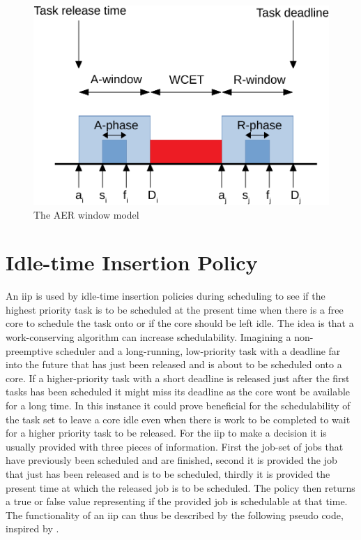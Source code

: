 \documentclass{kththesis}
\begin{document}
\begin{figure}

    \centering

    \includegraphics[width=0.8\linewidth]{images/aer_window_model.pdf}

    \caption{The AER window model}

    \label{fig:aer_window_model}

\end{figure}


\section{Idle-time Insertion Policy}

An \acrfull{iip} is used by idle-time insertion policies during scheduling to see if the highest
priority task is to be scheduled at the present time when there is a free core to schedule the task
onto or if the core should be left idle. The idea is that a work-conserving algorithm can increase
schedulability. Imagining a non-preemptive scheduler and a long-running, low-priority task with a
deadline far into the future that has just been released and is about to be scheduled onto a core.
If a higher-priority task with a short deadline is released just after the first tasks has been
scheduled it might miss its deadline as the core wont be available for a long time. In this instance
it could prove beneficial for the schedulability of the task set to leave a core idle even when
there is work to be completed to wait for a higher priority task to be released. For the
\acrshort{iip} to make a decision it is usually provided with three pieces of information. First the
job-set of jobs that have previously been scheduled and are finished, second it is provided the job
that just has been released and is to be scheduled, thirdly it is provided the present time at which
the released job is to be scheduled. The policy then returns a true or false value representing if
the provided job is schedulable at that time. The functionality of an \acrshort{iip} can thus be
described by the following pseudo code, inspired by \parencite{nasri_exact_2017}.
\end{document}
